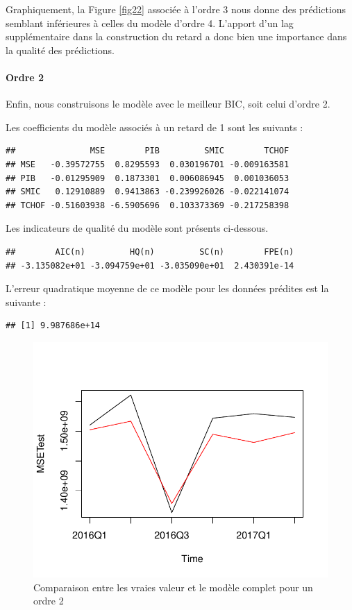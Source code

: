 \documentclass[11pt,]{article}
\let\oldparagraph\paragraph
\renewcommand{\paragraph}[1]{\oldparagraph{#1}\mbox{}}
\begin{document}
Graphiquement, la Figure \ref{fig22} associée à l'ordre 3 nous donne des
prédictions semblant inférieures à celles du modèle d'ordre 4. L'apport
d'un lag supplémentaire dans la construction du retard a donc bien une
importance dans la qualité des prédictions.

\paragraph{Ordre 2}\label{ordre-2}

Enfin, nous construisons le modèle avec le meilleur BIC, soit celui
d'ordre 2.

Les coefficients du modèle associés à un retard de 1 sont les suivants :

\begin{verbatim}
##               MSE        PIB         SMIC        TCHOF
## MSE   -0.39572755  0.8295593  0.030196701 -0.009163581
## PIB   -0.01295909  0.1873301  0.006086945  0.001036053
## SMIC   0.12910889  0.9413863 -0.239926026 -0.022141074
## TCHOF -0.51603938 -6.5905696  0.103373369 -0.217258398
\end{verbatim}

Les indicateurs de qualité du modèle sont présents ci-dessous.

\begin{verbatim}
##        AIC(n)         HQ(n)         SC(n)        FPE(n) 
## -3.135082e+01 -3.094759e+01 -3.035090e+01  2.430391e-14
\end{verbatim}

L'erreur quadratique moyenne de ce modèle pour les données prédites est
la suivante :

\begin{verbatim}
## [1] 9.987686e+14
\end{verbatim}

\begin{figure}[htbp]
\centering
\includegraphics{Rapport_final_files/figure-latex/unnamed-chunk-37-1.pdf}
\caption{\label{fig23} Comparaison entre les vraies valeur et le modèle
complet pour un ordre 2}
\end{figure}
\end{document}
